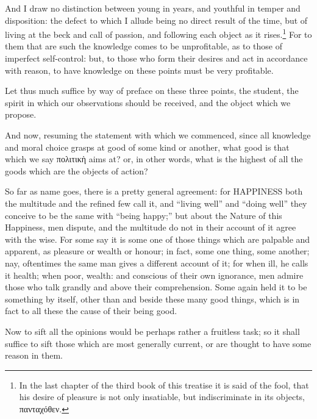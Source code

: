 And I draw no distinction between young in years, and youthful in temper and
disposition: the defect to which I allude being no direct result of the time,
but of living at the beck and call of passion, and following each object as it
rises.\footnote{In the last chapter of the third book of this treatise it is said of
the fool, that his desire of pleasure is not only insatiable, but
indiscriminate in its objects,
πανταχόθεν.} For
to them that are such the knowledge comes to be unprofitable, as to
those of imperfect self-control: but, to those who form their desires
and act in accordance with reason, to have knowledge on these points
must be very profitable.

Let thus much suffice by way of preface on these three points, the student, the
spirit in which our observations should be received, and the object which we
propose.


And now, resuming the statement with which we commenced, since all knowledge
and moral choice grasps at good of some kind or another, what good is that
which we say πολιτικὴ aims at? or, in
other words, what is the highest of all the goods which are the objects of
action?

So far as name goes, there is a pretty general agreement: for
HAPPINESS both the multitude and the refined few call it, and
“living well” and “doing well” they conceive to be the
same with “being happy;” but about the Nature of this Happiness,
men dispute, and the multitude do not in their account of it agree with the
wise. For some say it is some one of those things which are palpable and
apparent, as pleasure or wealth or honour; in fact, some one thing, some
another; nay, oftentimes the same man gives a different account of it; for when
ill, he calls it health; when poor, wealth: and conscious of their own
ignorance, men admire those who talk grandly and above their comprehension.
Some again held it to be something by itself, other than and beside these many
good things, which is in fact to all these the cause of their being good.

Now to sift all the opinions would be perhaps rather a fruitless task; so it
shall suffice to sift those which are most generally current, or are thought to
have some reason in them.

